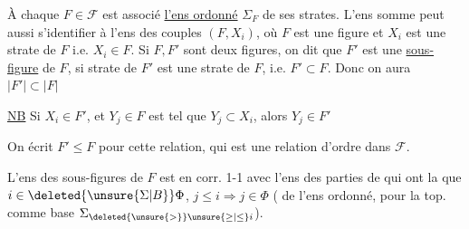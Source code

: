 À chaque $F\in\mathcal{F}$ est associé \uline{l'ens ordonné} $\Sigma_F$ de ses strates. L'ens somme
{\reversemarginpar{}}
peut aussi s'identifier à l'ens des couples $(F,X_i)$,  où $F$ est une figure et $X_i$ est une strate de $F$ i.e. $X_i\in F$.
Si $F,F'$ sont deux figures, on dit que $F'$ est une \uline{sous-figure} de $F$, si  strate de $F'$ est une strate de $F$, i.e. $F'\subset F$. Donc  on aura   $\lvert F'\rvert\subset\lvert F\rvert$

\uline{NB} Si $X_i\in F'$, et $Y_j\in F$ est tel que $Y_j\subset X_i$, alors $Y_j\in F'$



On écrit $F'\leq F$ pour cette relation, qui est une relation d'ordre dans $\mathcal{F}$.

L'ens des sous-figures de $F$ est en corr. 1-1 avec l'ens des parties  de   qui ont la  que  $i\in\deleted{\unsure{\Sigma|B}}\Phi$, $j\leq i\Rightarrow j\in\Phi$
(   de l'ens  ordonné, pour la top.   comme base    $\Sigma_{\deleted{\unsure{>}}\unsure{\geq|\leq}i}$).


